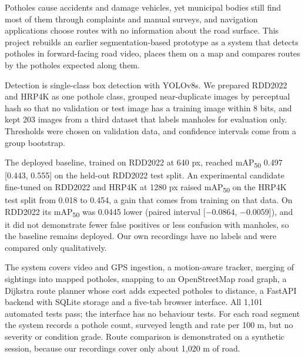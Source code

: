 Potholes cause accidents and damage vehicles, yet municipal bodies still find most of them through complaints and manual surveys, and navigation applications choose routes with no information about the road surface. This project rebuilds an earlier segmentation-based prototype as a system that detects potholes in forward-facing road video, places them on a map and compares routes by the potholes expected along them.

Detection is single-class box detection with YOLOv8s. We prepared RDD2022 and HRP4K as one pothole class, grouped near-duplicate images by perceptual hash so that no validation or test image has a training image within 8 bits, and kept 203 images from a third dataset that labels manholes for evaluation only. Thresholds were chosen on validation data, and confidence intervals come from a group bootstrap.

The deployed baseline, trained on RDD2022 at 640 px, reached mAP\textsubscript{50} 0.497 [0.443, 0.555] on the held-out RDD2022 test split. An experimental candidate fine-tuned on RDD2022 and HRP4K at 1280 px raised mAP\textsubscript{50} on the HRP4K test split from 0.018 to 0.454, a gain that comes from training on that data. On RDD2022 its mAP\textsubscript{50} was 0.0445 lower (paired interval [$-$0.0864, $-$0.0059]), and it did not demonstrate fewer false positives or less confusion with manholes, so the baseline remains deployed. Our own recordings have no labels and were compared only qualitatively.

The system covers video and GPS ingestion, a motion-aware tracker, merging of sightings into mapped potholes, snapping to an OpenStreetMap road graph, a Dijkstra route planner whose cost adds expected potholes to distance, a FastAPI backend with SQLite storage and a five-tab browser interface. All 1,101 automated tests pass; the interface has no behaviour tests. For each road segment the system records a pothole count, surveyed length and rate per 100 m, but no severity or condition grade. Route comparison is demonstrated on a synthetic session, because our recordings cover only about 1,020 m of road.
